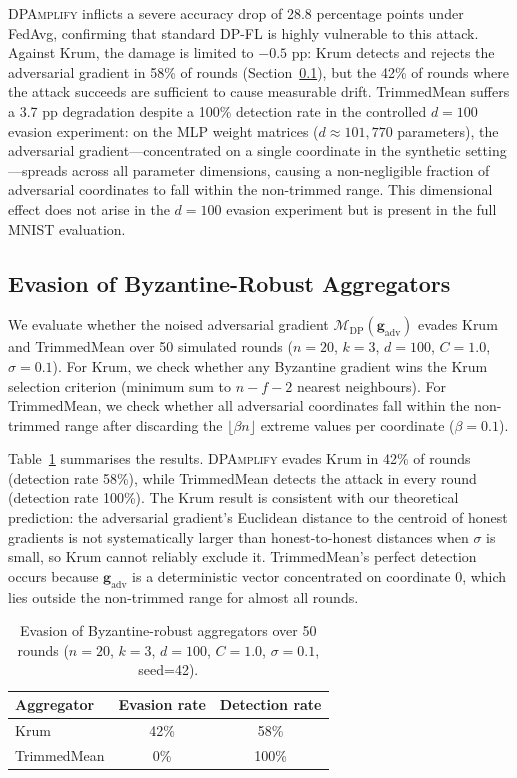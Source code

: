 \documentclass[conference]{IEEEtran}
\begin{document}
\textsc{DPAmplify} inflicts a severe accuracy drop of 28.8 percentage points under FedAvg,
confirming that standard DP-FL is highly vulnerable to this attack. Against Krum, the damage is
limited to $-0.5$ pp: Krum detects and rejects the adversarial gradient in 58\% of rounds
(Section~\ref{sec:eval-evasion}), but the 42\% of rounds where the attack succeeds are sufficient
to cause measurable drift. TrimmedMean suffers a 3.7 pp degradation despite a 100\% detection rate
in the controlled $d=100$ evasion experiment: on the MLP weight matrices ($d \approx 101{,}770$
parameters), the adversarial gradient---concentrated on a single coordinate in the synthetic
setting---spreads across all parameter dimensions, causing a non-negligible fraction of adversarial
coordinates to fall within the non-trimmed range. This dimensional effect does not arise in the
$d=100$ evasion experiment but is present in the full MNIST evaluation.

\subsection{Evasion of Byzantine-Robust Aggregators}
\label{sec:eval-evasion}

We evaluate whether the noised adversarial gradient $\mathcal{M}_{\mathrm{DP}}(\mathbf{g}_{\mathrm{adv}})$
evades Krum and TrimmedMean over 50 simulated rounds ($n=20$, $k=3$, $d=100$, $C=1.0$, $\sigma=0.1$).
For Krum, we check whether any Byzantine gradient wins the Krum selection criterion (minimum sum to
$n-f-2$ nearest neighbours). For TrimmedMean, we check whether all adversarial coordinates fall
within the non-trimmed range after discarding the $\lfloor\beta n\rfloor$ extreme values per coordinate
($\beta=0.1$).

Table~\ref{tab:evasion} summarises the results.
\textsc{DPAmplify} evades Krum in 42\% of rounds (detection rate 58\%), while TrimmedMean detects
the attack in every round (detection rate 100\%). The Krum result is consistent with our theoretical
prediction: the adversarial gradient's Euclidean distance to the centroid of honest gradients is not
systematically larger than honest-to-honest distances when $\sigma$ is small, so Krum cannot reliably
exclude it. TrimmedMean's perfect detection occurs because $\mathbf{g}_{\mathrm{adv}}$ is a
deterministic vector concentrated on coordinate 0, which lies outside the non-trimmed range for
almost all rounds.

\begin{table}[t]
    \centering
    \caption{Evasion of Byzantine-robust aggregators over 50 rounds
             ($n=20$, $k=3$, $d=100$, $C=1.0$, $\sigma=0.1$, seed=42).}
    \label{tab:evasion}
    \begin{tabular}{lcc}
        \toprule
        Aggregator  & Evasion rate & Detection rate \\
        \midrule
        Krum         & 42\%  & 58\%  \\
        TrimmedMean  &  0\%  & 100\% \\
        \bottomrule
    \end{tabular}
\end{table}
\end{document}

